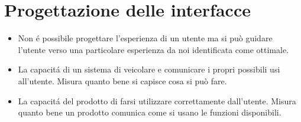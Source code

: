 \chapter{Progettazione delle interfacce}

\begin{itemize}
    \item Non \'e possibile progettare l'esperienza di un utente ma si pu\`o guidare l'utente verso una particolare esperienza da noi identificata come ottimale.
    \item {} La capacit\'a di un sistema di veicolare e comunicare i propri possibili usi all'utente. Misura quanto bene si capisce cosa si pu\`o fare.
    \item {} La capacit\'a del prodotto di farsi utilizzare correttamente dall'utente. Misura quanto bene un prodotto comunica come si usano le funzioni disponibili.
\end{itemize}